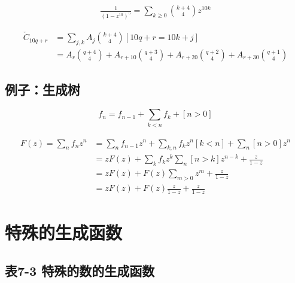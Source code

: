\begin{align*}
    \frac{1}{(1-z^{10})^5}=\sum_{k \ge 0} {k+4 \choose 4} z^{10 k}
\end{align*}

\begin{equation}
    \begin{aligned}
    \check{C}_{10q+r} &=\sum_{j, k} A_{j}{k+4  \choose 4}[10 q+r=10 k+j] \\
        &=A_{r}{q+4  \choose 4}+A_{r+10}{q+3  \choose 4}+A_{r+20}{q+2  \choose 4}+A_{r+30}{q+1  \choose 4}
    \end{aligned}
\end{equation}

\subsection{例子：生成树}

\begin{equation}
    f_{n}=f_{n-1}+\sum_{k<n} f_{k}+[n>0]
\end{equation}

\begin{align*}
    \begin{aligned}
        F(z)=\sum_{n} f_{n} z^{n} &=\sum_{n} f_{n-1} z^{n}+\sum_{k, n} f_{k} z^{n}[k<n]+\sum_{n}[n>0] z^{n} \\
            &=z F(z)+\sum_{k} f_{k} z^{k} \sum_{n}[n>k] z^{n-k}+\frac{z}{1-z} \\
            &=z F(z)+F(z) \sum_{m>0} z^{m}+\frac{z}{1-z} \\
            &=z F(z)+F(z) \frac{z}{1-z}+\frac{z}{1-z}
    \end{aligned}
\end{align*}

\section{特殊的生成函数}
\subsection{表7-3 特殊的数的生成函数}

